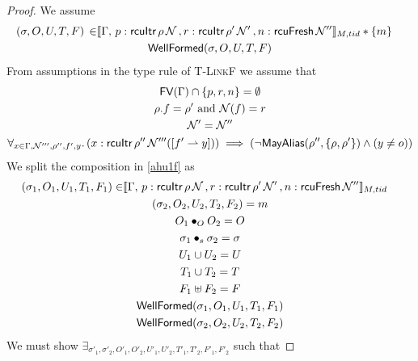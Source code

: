 \begin{proof}
 We assume
\begin{gather}\label{ahu1f}
  \begin{aligned}
    (\sigma, O, U, T,F) \, \in &  \llbracket \Gamma,\,
 p:\textsf{rcuItr}\, \rho \, \mathcal{N} \, ,
  r:\textsf{rcuItr}\, \rho' \, \mathcal{N}' \, , n:\textsf{rcuFresh} \, \mathcal{N}'' \rrbracket_{M,tid} * \{m\}
    \end{aligned} \\
\textsf{WellFormed}(\sigma,O,U,T,F)
\label{ahu2f}
\end{gather}
From assumptions in the type rule of \textsc{T-LinkF} we assume that
\begin{gather}
\textsf{FV}(\Gamma) \cap \{p,r,n\}  =\emptyset 
  \label{ahu3f} \\
\rho.f  = \rho' \text{ and } \mathcal{N}(f) = r
    \label{ahu4f} \\
\mathcal{N}' = \mathcal{N}''
\label{ahu5f} \\
\begin{aligned}
\forall_{x \in \Gamma, \mathcal{N}''', \rho'',f',y} \ldotp (x:\textsf{rcuItr}\,\rho''\,\mathcal{N}'''([f'\rightharpoonup y])) \implies (\neg\mathsf{MayAlias}(\rho'',\{\rho,\rho'\}) \land (y\neq o  ))  
\label{ahu6f}
  \end{aligned}
\end{gather}
We split the composition in  \ref{ahu1f} as 
\begin{gather} \label{ahu11f}
  \begin{aligned}
    (\sigma_1, O_{1}, U_{1}, T_{1} ,F_1) \in & \llbracket \Gamma,\,
 p:\textsf{rcuItr}\, \rho \, \mathcal{N} \, ,
  r:\textsf{rcuItr}\, \rho' \, \mathcal{N}' \, , n:\textsf{rcuFresh} \, \mathcal{N}'' \rrbracket_{M,tid} \end{aligned}\\
\label{ahu12f}
(\sigma_2, O_{2}, U_{2}, T_{2},F_2) = m
\\
\label{ahu13f}
O_{1} \bullet_{O} O_{2} = O
\\
\label{ahusigf}
\sigma_1 \bullet_s \sigma_2 = \sigma \\
\label{ahu14f}
U_{1} \cup U_{2} = U
\\
\label{ahu15f}
T_{1} \cup T_{2} = T
\\
\label{ahufff}
F_1 \uplus F_2 = F
\\
\label{ahu16f}
\textsf{WellFormed}(\sigma_1,O_{1},U_{1},T_{1},F_1)
\\
\label{ahu17f}
\textsf{WellFormed}(\sigma_2,O_{2},U_{2},T_{2},F_2)
\end{gather}
We must show $\exists_{\sigma'_1, \sigma'_2, O'_{1}, O'_{2}, U'_{1}, U'_{2}, T'_{1}, T'_{2}, F'_1, F'_2}$ such that

\end{proof}

